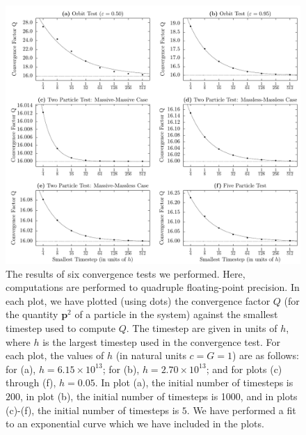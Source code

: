 \documentclass[aps,onecolumn,notitlepage,eqsecnum,nofootinbib,floatfix,superscriptaddress]{revtex4-1}
\begin{document}
\begin{figure}
 \includegraphics[width=\linewidth]{convergence_tests.pdf}
\caption{The results of six convergence tests we performed. Here, computations are performed to quadruple floating-point precision. In each plot, we have plotted (using dots) the convergence factor $Q$ (for the quantity $\textbf{p}^2$ of a particle in the system) against the smallest timestep used to compute $Q$. The timestep are given in units of $h$, where $h$ is the largest timestep used in the convergence test. For each plot, the values of $h$ (in natural units $c=G=1$) are as follows: for (a), $h=6.15 \times 10^{13}$; for (b), $h=2.70 \times 10^{13}$; and for plots (c) through (f), $h=0.05$. In plot (a), the initial number of timesteps is $200$, in plot (b), the initial number of timesteps is 1000, and in plots (c)-(f), the initial number of timesteps is $5$. We have performed a fit to an exponential curve which we have included in the plots.}
\label{FIG-ConvergenceTests}
\end{figure}
\end{document}
